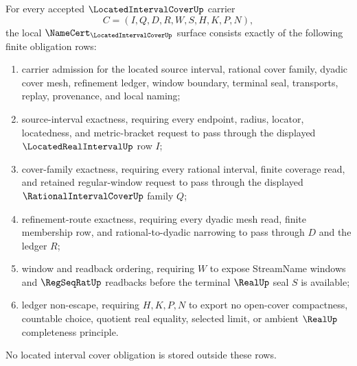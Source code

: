 \begin{theorem}
\label{thm:located-interval-cover-namecert-obligations}
For every accepted $\LocatedIntervalCoverUp$ carrier
$$
C=(I,Q,D,R,W,S,H,K,P,N),
$$
the local $\NameCert_{\LocatedIntervalCoverUp}$ surface consists exactly of the following finite obligation rows:
\begin{enumerate}
\item carrier admission for the located source interval, rational cover family, dyadic cover mesh, refinement ledger, window boundary, terminal seal, transports, replay, provenance, and local naming;
\item source-interval exactness, requiring every endpoint, radius, locator, locatedness, and metric-bracket request to pass through the displayed $\LocatedRealIntervalUp$ row $I$;
\item cover-family exactness, requiring every rational interval, finite coverage read, and retained regular-window request to pass through the displayed $\RationalIntervalCoverUp$ family $Q$;
\item refinement-route exactness, requiring every dyadic mesh read, finite membership row, and rational-to-dyadic narrowing to pass through $D$ and the ledger $R$;
\item window and readback ordering, requiring $W$ to expose StreamName windows and $\RegSeqRatUp$ readbacks before the terminal $\RealUp$ seal $S$ is available;
\item ledger non-escape, requiring $H,K,P,N$ to export no open-cover compactness, countable choice, quotient real equality, selected limit, or ambient $\RealUp$ completeness principle.
\end{enumerate}
No located interval cover obligation is stored outside these rows.
\end{theorem}
